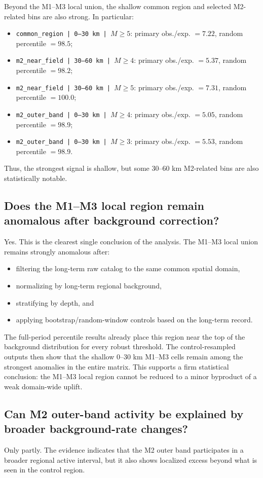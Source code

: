 \documentclass[11pt]{article}
\begin{document}
Beyond the M1--M3 local union, the shallow common region and selected M2-related bins are also strong. In particular:
\begin{itemize}[leftmargin=1.5em]
    \item \texttt{common\_region | 0--30 km | $M\geq 5$}: primary obs./exp. $= 7.22$, random percentile $= 98.5$;
    \item \texttt{m2\_near\_field | 30--60 km | $M\geq 4$}: primary obs./exp. $= 5.37$, random percentile $= 98.2$;
    \item \texttt{m2\_near\_field | 30--60 km | $M\geq 5$}: primary obs./exp. $= 7.31$, random percentile $= 100.0$;
    \item \texttt{m2\_outer\_band | 0--30 km | $M\geq 4$}: primary obs./exp. $= 5.05$, random percentile $= 98.9$;
    \item \texttt{m2\_outer\_band | 0--30 km | $M\geq 3$}: primary obs./exp. $= 5.53$, random percentile $= 98.9$.
\end{itemize}
Thus, the strongest signal is shallow, but some 30--60 km M2-related bins are also statistically notable.

\subsection{Does the M1--M3 local region remain anomalous after background correction?}
Yes. This is the clearest single conclusion of the analysis. The M1--M3 local union remains strongly anomalous after:
\begin{itemize}[leftmargin=1.5em]
    \item filtering the long-term raw catalog to the same common spatial domain,
    \item normalizing by long-term regional background,
    \item stratifying by depth, and
    \item applying bootstrap/random-window controls based on the long-term record.
\end{itemize}
The full-period percentile results already place this region near the top of the background distribution for every robust threshold. The control-resampled outputs then show that the shallow 0--30 km M1--M3 cells remain among the strongest anomalies in the entire matrix. This supports a firm statistical conclusion: the M1--M3 local region cannot be reduced to a minor byproduct of a weak domain-wide uplift.

\subsection{Can M2 outer-band activity be explained by broader background-rate changes?}
Only partly. The evidence indicates that the M2 outer band participates in a broader regional active interval, but it also shows localized excess beyond what is seen in the control region.
\end{document}
